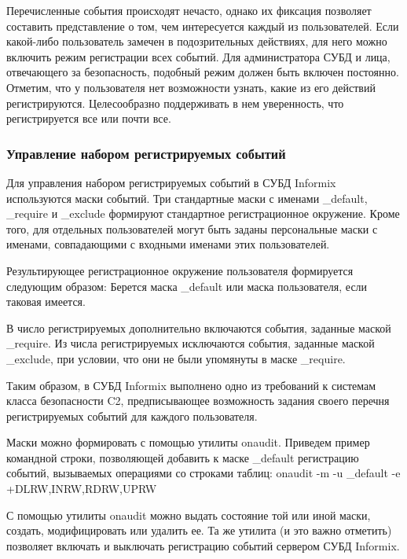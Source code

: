 Перечисленные события происходят нечасто, однако их фиксация позволяет составить представление о том, чем интересуется каждый из пользователей. Если какой-либо пользователь замечен в подозрительных действиях, для него можно включить режим регистрации всех событий. Для администратора СУБД и лица, отвечающего за безопасность, подобный режим должен быть включен постоянно.
Отметим, что у пользователя нет возможности узнать, какие из его действий регистрируются. Целесообразно поддерживать в нем уверенность, что регистрируется все или почти все.

\subsubsection{Управление набором регистрируемых событий}

Для управления набором регистрируемых событий в СУБД Informix используются маски событий. Три стандартные маски с именами \_default, \_require и \_exclude формируют стандартное регистрационное окружение. Кроме того, для отдельных пользователей могут быть заданы персональные маски с именами, совпадающими с входными именами этих пользователей.

Результирующее регистрационное окружение пользователя формируется следующим образом:
Берется маска \_default или маска пользователя, если таковая имеется.

В число регистрируемых дополнительно включаются события, заданные маской \_require.
Из числа регистрируемых исключаются события, заданные маской \_exclude, при условии, что они не были упомянуты в маске \_require.

Таким образом, в СУБД Informix выполнено одно из требований к системам класса безопасности C2, предписывающее возможность задания своего перечня регистрируемых событий для каждого пользователя.

Маски можно формировать с помощью утилиты onaudit. Приведем пример командной строки, позволяющей добавить к маске \_default регистрацию событий, вызываемых операциями со строками таблиц:
onaudit -m -u \_default -e +DLRW,INRW,RDRW,UPRW

С помощью утилиты onaudit можно выдать состояние той или иной маски, создать, модифицировать или удалить ее. Та же утилита (и это важно отметить) позволяет включать и выключать регистрацию событий сервером СУБД Informix.

